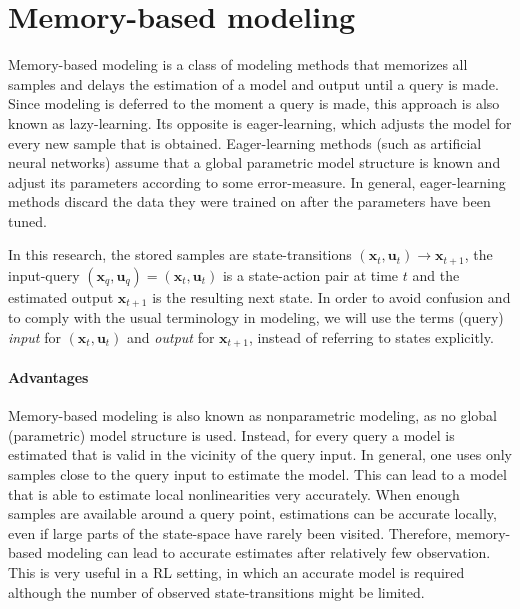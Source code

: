 \section{Memory-based modeling}\label{sec:LLR-memory-based modeling}
Memory-based modeling is a class of modeling methods that memorizes all samples and delays the estimation of a model and output until a query is made. Since modeling is deferred to the moment a query is made, this approach is also known as lazy-learning. Its opposite is eager-learning, which adjusts the model for every new sample that is obtained. Eager-learning methods (such as artificial neural networks) assume that a global parametric model structure is known and adjust its parameters according to some error-measure. In general, eager-learning methods discard the data they were trained on after the parameters have been tuned.


In this research, the stored samples are state-transitions $(\mathbf{x}_t,\mathbf{u}_t)\rightarrow \mathbf{x}_{t+1}$, the input-query $(\mathbf{x}_q,\mathbf{u}_q)=(\mathbf{x}_t,\mathbf{u}_t)$ is a state-action pair at time $t$ and the estimated output $\hat{\mathbf{x}}_{t+1}$ is the resulting next state. In order to avoid confusion and to comply with the usual terminology in modeling, we will use the terms (query) \emph{input} for $(\mathbf{x}_t,\mathbf{u}_t)$ and \emph{output} for $\mathbf{x}_{t+1}$, instead of referring to states explicitly.


\paragraph{Advantages} Memory-based modeling is also known as nonparametric modeling, as no global (parametric) model structure is used. Instead, for every query a model is estimated that is valid in the vicinity of the query input. In general, one uses only samples close to the query input to estimate the model. This can lead to a model that is able to estimate local nonlinearities very accurately. When enough samples are available around a query point, estimations can be accurate locally, even if large parts of the state-space have rarely been visited. Therefore, memory-based modeling can lead to accurate estimates after relatively few observation. This is very useful in a \ac{RL} setting, in which an accurate model is required although the number of observed state-transitions might be limited.

